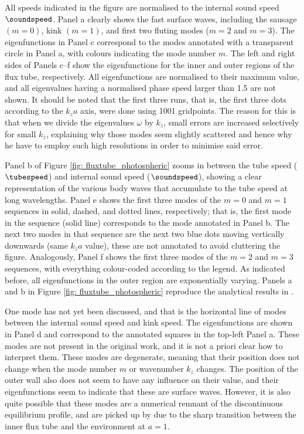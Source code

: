 All speeds indicated in the figure are normalised to the internal sound speed $\soundspeed$. Panel a clearly shows the fast surface waves, including the sausage $(m = 0)$, kink $(m = 1)$, and first two fluting modes ($m = 2$ and $m = 3$). The eigenfunctions in Panel c correspond to the modes annotated with a transparent circle in Panel a, with colours indicating the mode number $m$. The left and right sides of Panels c--f show the eigenfunctions for the inner and outer regions of the flux tube, respectively. All eigenfunctions are normalised to their maximum value, and all eigenvalues having a normalised phase speed larger than 1.5 are not shown. It should be noted that the first three runs, that is, the first three dots according to the $k_z a$ axis, were done using 1001 gridpoints. The reason for this is that when we divide the eigenvalues $\omega$ by $k_z$, small errors are increased selectively for small $k_z$, explaining why those modes seem slightly scattered and hence why he have to employ such high resolutions in order to minimise said error.

Panel b of Figure \ref{fig: fluxtube_photospheric} zooms in between the tube speed ($\tubespeed$) and internal sound speed ($\soundspeed$), showing a clear representation of the various body waves that accumulate to the tube speed at long wavelengths. Panel e shows the first three modes of the $m = 0$ and $m = 1$ sequences in solid, dashed, and dotted lines, respectively; that is, the first mode in the sequence (solid line) corresponds to the mode annotated in Panel b. The next two modes in that sequence are the next two blue dots moving vertically downwards (same $k_z a$ value), these are not annotated to avoid cluttering the figure. Analogously, Panel f shows the first three modes of the $m = 2$ and $m = 3$ sequences, with everything colour-coded according to the legend. As indicated before, all eigenfunctions in the outer region are exponentially varying. Panels a and b in Figure \ref{fig: fluxtube_photospheric} reproduce the analytical results in \citet[Figure 6.5]{book_roberts}.

One mode has not yet been discussed, and that is the horizontal line of modes between the internal sound speed and kink speed. The eigenfunctions are shown in Panel d and correspond to the annotated squares in the top-left Panel a. These modes are not present in the original work, and it is not a priori clear how to interpret them. These modes are degenerate, meaning that their position does not change when the mode number $m$ or wavenumber $k_z$ changes. The position of the outer wall also does not seem to have any influence on their value, and their eigenfunctions seem to indicate that these are surface waves. However, it is also quite possible that these modes are a numerical remnant of the discontinuous equilibrium profile, and are picked up by {\legolas} due to the sharp transition between the inner flux tube and the environment at $a = 1$.

